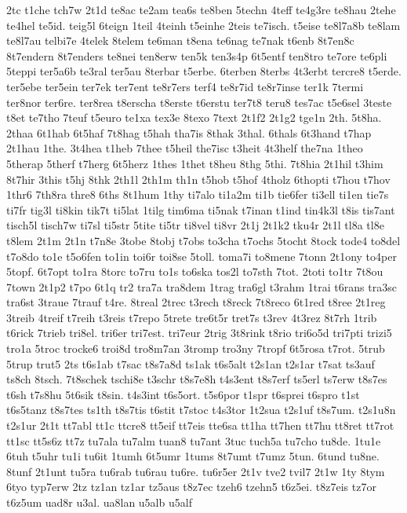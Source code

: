 {2tc
t1che
tch7w
2t1d
te8ac
te2am
tea6s
te8ben
5techn
4teff
te4g3re
te8hau
2tehe
te4hel
te5id.
teig5l
6teign
1teil
4teinh
t5einhe
2teis
te7isch.
t5eise
te8l7a8b
te8lam
te8l7au
telbi7e
4telek
8telem
te6man
t8ena
te6nag
te7nak
t6enb
8t7en8c
8t7endern
8t7enders
te8nei
ten8erw
ten5k
ten3s4p
6t5entf
ten8tro
te7ore
te6pli
5teppi
ter5a6b
te3ral
ter5au
8terbar
t5erbe.
6terben
8terbs
4t3erbt
tercre8
t5erde.
ter5ebe
ter5ein
ter7ek
ter7ent
te8r7ers
terf4
te8r7id
te8r7inse
ter1k
7termi
ter8nor
ter6re.
ter8rea
t8erscha
t8erste
t6erstu
ter7t8
teru8
tes7ac
t5e6sel
3teste
t8et
te7tho
7teuf
t5euro
te1xa
tex3e
8texo
7text
2t1f2
2t1g2
tge1n
2th.
5t8ha.
2thaa
6t1hab
6t5haf
7t8hag
t5hah
tha7is
8thak
3thal.
6thals
6t3hand
t7hap
2t1hau
1the.
3t4hea
t1heb
7thee
t5heil
the7isc
t3heit
4t3helf
the7na
1theo
5therap
5therf
t7herg
6t5herz
1thes
1thet
t8heu
8thg
5thi.
7t8hia
2t1hil
t3him
8t7hir
3this
t5hj
8thk
2th1l
2th1m
th1n
t5hob
t5hof
4tholz
6thopti
t7hou
t7hov
1thr6
7th8ra
thre8
6ths
8t1hum
1thy
ti7alo
ti1a2m
ti1b
tie6fer
ti3ell
ti1en
tie7s
ti7fr
tig3l
ti8kin
tik7t
ti5lat
1tilg
tim6ma
ti5nak
t7inan
t1ind
tin4k3l
t8is
tis7ant
tisch5l
tisch7w
ti7sl
ti5str
5tite
ti5tr
ti8vel
ti8vr
2t1j
2t1k2
tku4r
2t1l
tl8a
tl8e
t8lem
2t1m
2t1n
t7n8e
3tobe
8tobj
t7obs
to3cha
t7ochs
5tocht
8tock
tode4
to8del
t7o8do
to1e
t5o6fen
to1in
toi6r
toi8se
5toll.
toma7i
to8mene
7tonn
2t1ony
to4per
5topf.
6t7opt
to1ra
8torc
to7ru
to1s
to6ska
tos2l
to7sth
7tot.
2toti
to1tr
7t8ou
7town
2t1p2
t7po
6t1q
tr2
tra7a
tra8dem
1trag
tra6gl
t3rahm
1trai
t6rans
tra3sc
tra6st
3traue
7trauf
t4re.
8treal
2trec
t3rech
t8reck
7t8reco
6t1red
t8ree
2t1reg
3treib
4treif
t7reih
t3reis
t7repo
5trete
tre6t5r
tret7s
t3rev
4t3rez
8t7rh
1trib
t6rick
7trieb
tri8el.
tri6er
tri7est.
tri7eur
2trig
3t8rink
t8rio
tri6o5d
tri7pti
trizi5
tro1a
5troc
trocke6
troi8d
tro8m7an
3tromp
tro3ny
7tropf
6t5rosa
t7rot.
5trub
5trup
trut5
2ts
t6s1ab
t7sac
t8s7a8d
ts1ak
t6s5alt
t2s1an
t2s1ar
t7sat
ts3auf
ts8ch
8tsch.
7t8schek
tschi8e
t3schr
t8s7e8h
t4s3ent
t8s7erf
ts5erl
ts7erw
t8s7es
t6sh
t7s8hu
5t6sik
t8sin.
t4s3int
t6s5ort.
t5s6por
t1spr
t6sprei
t6spro
t1st
t6s5tanz
t8s7tes
ts1th
t8s7tis
t6stit
t7stoc
t4s3tor
1t2sua
t2s1uf
t8s7um.
t2s1u8n
t2s1ur
2t1t
tt7abl
tt1c
ttcre8
tt5eif
tt7eis
tte6sa
tt1ha
tt7hen
tt7hu
tt8ret
tt7rot
tt1sc
tt5s6z
tt7z
tu7ala
tu7alm
tuan8
tu7ant
3tuc
tuch5a
tu7cho
tu8de.
1tu1e
6tuh
t5uhr
tu1i
tu6it
1tumh
6t5umr
1tums
8t7umt
t7umz
5tun.
6tund
tu8ne.
8tunf
2t1unt
tu5ra
tu6rab
tu6rau
tu6re.
tu6r5er
2t1v
tve2
tvil7
2t1w
1ty
8tym
6tyo
typ7erw
2tz
tz1an
tz1ar
tz5aus
t8z7ec
tzeh6
tzehn5
t6z5ei.
t8z7eis
tz7or
t6z5um
uad8r
u3al.
ua8lan
u5alb
u5alf
}
